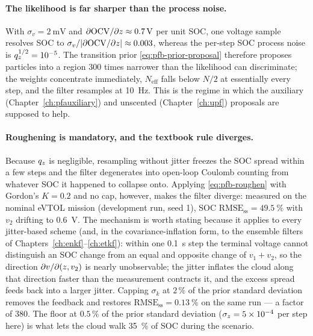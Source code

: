 \paragraph{The likelihood is far sharper than the process noise.}
With $\sigma_v = \SI{2}{\milli\volt}$ and $\partial \mathrm{OCV}/\partial z \approx
\SI{0.7}{\volt}$ per unit SOC, one voltage sample resolves SOC to
$\sigma_v / |\partial\mathrm{OCV}/\partial z| \approx 0.003$, whereas the per-step SOC process noise is
$q_{z}^{1/2} = 10^{-5}$.  The transition prior \eqref{eq:pfb-prior-proposal} therefore proposes
particles into a region $300$ times narrower than the likelihood can discriminate; the weights
concentrate immediately, $N_{\mathrm{eff}}$ falls below $N/2$ at essentially every step, and the
filter resamples at \SI{10}{\hertz}.  This is the regime in which the auxiliary
(Chapter~\ref{ch:pfauxiliary}) and unscented (Chapter~\ref{ch:upf}) proposals are supposed to help.

\paragraph{Roughening is mandatory, and the textbook rule diverges.}
Because $q_{z}$ is negligible, resampling without jitter freezes the SOC spread within a few
steps and the filter degenerates into open-loop Coulomb counting from whatever SOC it happened to
collapse onto.  Applying \eqref{eq:pfb-roughen} with Gordon's $K=0.2$ and no cap, however, makes
the filter diverge: measured on the nominal eVTOL mission (development run, seed 1), SOC
$\mathrm{RMSE}_{\mathrm{ss}} = \SI{49.5}{\percent}$ with $v_2$ drifting to \SI{0.6}{\volt}.  The mechanism is
worth stating because it applies to every jitter-based scheme (and, in the covariance-inflation
form, to the ensemble filters of Chapters~\ref{ch:enkf}--\ref{ch:etkf}): within one \SI{0.1}{\second}
step the terminal voltage cannot distinguish an SOC change from an equal and opposite change of
$v_1 + v_2$, so the direction $\partial v/\partial(z, v_2)$ is nearly unobservable; the jitter
inflates the cloud along that direction faster than the measurement contracts it, and the excess
spread feeds back into a larger jitter.  Capping $\sigma_k$ at $2\,\%$ of the prior standard
deviation removes the feedback and restores $\mathrm{RMSE}_{\mathrm{ss}} = \SI{0.13}{\percent}$ on
the same run --- a factor of \num{380}.  The floor at $0.5\,\%$ of the prior standard deviation
($\sigma_{z} = 5\times10^{-4}$ per step here) is what lets the cloud walk \SI{35}{\percent} of
SOC during the  scenario.

